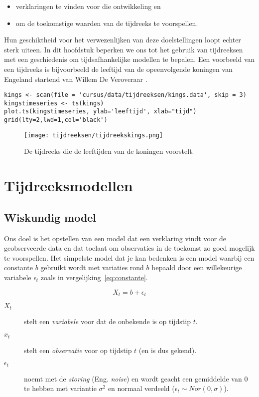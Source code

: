 \begin{itemize}
	\item verklaringen te vinden voor die ontwikkeling en
	\item om de toekomstige waarden van de tijdreeks te voorspellen.
\end{itemize}

Hun geschiktheid voor het verwezenlijken van deze doelstellingen loopt echter sterk uiteen. In dit hoofdstuk beperken we ons tot het gebruik van tijdreeksen met een geschiedenis om tijdsafhankelijke modellen te bepalen. Een voorbeeld van een tijdreeks is bijvoorbeeld de leeftijd van de opeenvolgende koningen van Engeland startend van Willem De Veroveraar \autocite{Hipel1994}.

\begin{lstlisting}
kings <- scan(file = 'cursus/data/tijdreeksen/kings.data', skip = 3)
kingstimeseries <- ts(kings)
plot.ts(kingstimeseries, ylab='leeftijd', xlab="tijd")
grid(lty=2,lwd=1,col='black')
\end{lstlisting}

\begin{figure}
	\centering
	\texttt{[image: tijdreeksen/tijdreekskings.png]}
	\caption{De tijdreeks die de leeftijden van de koningen voorstelt.}
	\label{fig:tijdreeks11}
\end{figure}

\section{Tijdreeksmodellen}

\subsection{Wiskundig model}

Ons doel is het opstellen van een model dat een verklaring vindt voor de geobserveerde data en dat toelaat om observaties in de toekomst zo goed mogelijk te voorspellen. Het simpelste model dat je kan bedenken is een model waarbij een constante $b$ gebruikt wordt met variaties rond $b$ bepaald door een willekeurige variabele $\epsilon_{t}$ zoals in vergelijking~\ref{eq:constante}. 

\begin{equation}
	X_{t} = b + \epsilon_{t}
\label{eq:constante}
\end{equation}

\begin{description}
  \item [$X_{t}$] stelt een \emph{variabele} voor dat de onbekende is op tijdstip $t$.
  \item [$x_{t}$] stelt een \emph{observatie} voor op tijdstip $t$ (en is dus gekend). 
  \item [$\epsilon_{t}$] noemt met de \emph{storing} (Eng. \emph{noise}) en wordt geacht een gemiddelde van $0$ te hebben met variantie $\sigma^{2}$ en normaal verdeeld ($\epsilon_{t} \sim Nor(0, \sigma)$). 
\end{description}

